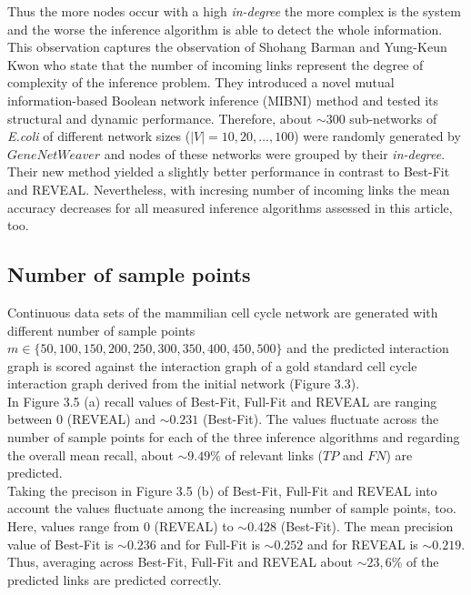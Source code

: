 Thus the more nodes occur with a high \textit{in-degree} the more complex is the system and the worse the inference algorithm is able to detect the whole information. This observation captures the observation of Shohang Barman and Yung-Keun Kwon \citep{Barman.2017} who state that the number of incoming links represent the degree of complexity of the inference problem. They introduced a novel mutual information-based Boolean network inference (MIBNI) method and tested its structural and dynamic performance. Therefore, about $\sim 300$ sub-networks of \textit{E.coli} of different network sizes ($|V| = 10,20,$...$,100$) were randomly generated by $GeneNetWeaver$ and nodes of these networks were grouped by their \textit{in-degree}. Their new method yielded a slightly better performance in contrast to Best-Fit and REVEAL. Nevertheless, with incresing number of incoming links the mean accuracy decreases for all measured inference algorithms assessed in this article, too.


\subsection*{Number of sample points}
Continuous data sets of the mammilian cell cycle network are generated with different number of sample points $m\in \{50,100,150,200,250,300,350,400,450,500\}$ and the predicted interaction graph is scored against the interaction graph of a gold standard cell cycle interaction graph derived from the initial network (Figure 3.3).\\
In Figure 3.5 (a) recall values of Best-Fit, Full-Fit and REVEAL are ranging between $0$ (REVEAL) and $\sim 0.231$ (Best-Fit). The values fluctuate across the number of sample points for each of the three inference algorithms and regarding the overall mean recall, about $\sim 9.49\%$ of relevant links ($TP$ and $FN$) are predicted. \\
Taking the precison in Figure 3.5 (b) of Best-Fit, Full-Fit and REVEAL into account the values fluctuate among the increasing number of sample points, too. Here, values range from $0$ (REVEAL) to $\sim 0.428$ (Best-Fit). 
The mean precision value of Best-Fit is $\sim 0.236$ and for Full-Fit is $\sim 0.252$ and for REVEAL is $\sim 0.219$. \\
Thus, averaging across Best-Fit, Full-Fit and REVEAL about $\sim 23,6\% $ of the predicted links are predicted correctly.

